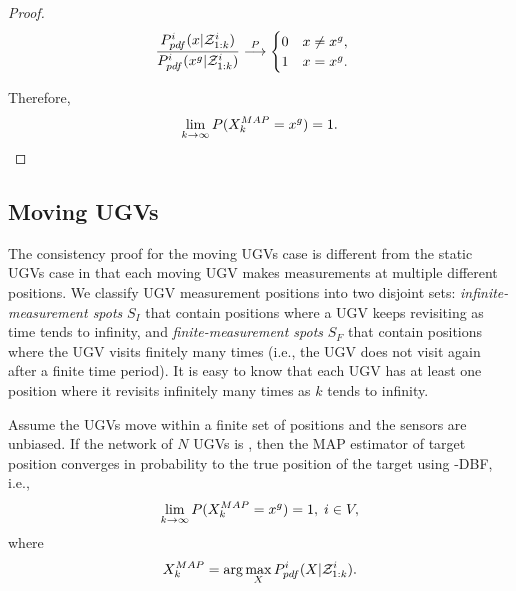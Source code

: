\begin{proof}
		\small\begin{equation*}
		\frac{P^i_{pdf}(x|\mathcal{Z}^i_{1:k})}{P^i_{pdf}(x^g|\mathcal{Z}^i_{1:k})}\overset{P}{\longrightarrow}
		\begin{cases}
		0\quad x\neq x^g,\\
		1\quad x= x^g.
		\end{cases}		
		\end{equation*}\normalsize
		
		Therefore,
		\small\begin{equation*}
		\lim\limits_{k\rightarrow \infty}
		P(X_k^{MAP}=x^g)=1.
		\end{equation*}\normalsize		
		
	\end{proof}
	

	\subsection{Moving UGVs}
	The consistency proof for the moving UGVs case is different from the static UGVs case in that each moving UGV makes measurements at multiple different positions.
	We classify UGV measurement positions into two disjoint sets: \textit{infinite-measurement spots} \textcolor{\revcol}{$S_I$} that contain positions where a UGV keeps revisiting as time tends to infinity, and \textit{finite-measurement spots} \textcolor{\revcol}{$S_F$} that contain positions where the UGV visits finitely many times (i.e., the UGV does not visit again after a finite time period).
	It is easy to know that each UGV has at least one position where it revisits infinitely many times as $k$ tends to infinity.
			
	\begin{thm}\label{thm:\proto-dbf-mov-ugv}
		Assume the UGVs move within a finite set of positions and the sensors are unbiased. If the network of $N$ UGVs is \fc, then the MAP estimator of target position converges in probability to the true position of the target using \proto-DBF, i.e.,
		\small\begin{equation*}
		\lim\limits_{k\rightarrow \infty}
		P(X^{MAP}_k=x^g)=1,\;i\in V,
		\end{equation*}\normalsize		
		\textcolor{\revcol}{where 
		\small\begin{equation*}
		X_k^{MAP}=\arg\max\limits_{X}P^i_{pdf}(X|\mathcal{Z}^{i}_{1:k}).
		\end{equation*}}	
	\end{thm}
		
